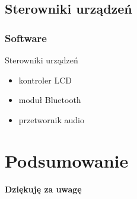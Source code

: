 \documentclass{beamer}
\newenvironment{ramka}{\begin{frame}}
{
		\end{frame}
}
\begin{document}
	\subsection{Sterowniki urządzeń}
	\begin{ramka}
		\frametitle{Software}
		\begin{block}{Sterowniki urządzeń}
			\begin{itemize}
				\item<1-> kontroler LCD
				\item<1-> moduł Bluetooth
				\item<1-> przetwornik audio
			\end{itemize}
		\end{block}
	\end{ramka}
	
	\section*{Podsumowanie}
	\begin{ramka}
		\begin{center}
			\textbf{\Large{Dziękuję za uwagę}}
		\end{center}
	\end{ramka}
\end{document}
